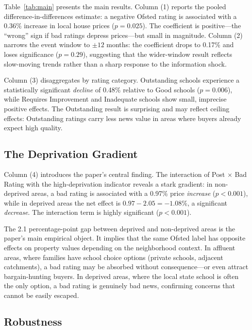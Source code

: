 \documentclass[12pt]{article}
\begin{document}
Table~\ref{tab:main} presents the main results. Column (1) reports the pooled difference-in-differences estimate: a negative Ofsted rating is associated with a 0.36\% increase in local house prices ($p = 0.025$). The coefficient is positive---the ``wrong'' sign if bad ratings depress prices---but small in magnitude. Column (2) narrows the event window to $\pm 12$ months: the coefficient drops to 0.17\% and loses significance ($p = 0.29$), suggesting that the wider-window result reflects slow-moving trends rather than a sharp response to the information shock.

Column (3) disaggregates by rating category. Outstanding schools experience a statistically significant \textit{decline} of 0.48\% relative to Good schools ($p = 0.006$), while Requires Improvement and Inadequate schools show small, imprecise positive effects. The Outstanding result is surprising and may reflect ceiling effects: Outstanding ratings carry less news value in areas where buyers already expect high quality.

\subsection{The Deprivation Gradient}

Column (4) introduces the paper's central finding. The interaction of Post $\times$ Bad Rating with the high-deprivation indicator reveals a stark gradient: in non-deprived areas, a bad rating is associated with a 0.97\% price \textit{increase} ($p < 0.001$), while in deprived areas the net effect is $0.97 - 2.05 = -1.08\%$, a significant \textit{decrease}. The interaction term is highly significant ($p < 0.001$).

The 2.1 percentage-point gap between deprived and non-deprived areas is the paper's main empirical object. It implies that the same Ofsted label has opposite effects on property values depending on the neighborhood context. In affluent areas, where families have school choice options (private schools, adjacent catchments), a bad rating may be absorbed without consequence---or even attract bargain-hunting buyers. In deprived areas, where the local state school is often the only option, a bad rating is genuinely bad news, confirming concerns that cannot be easily escaped.

\subsection{Robustness}
\end{document}
